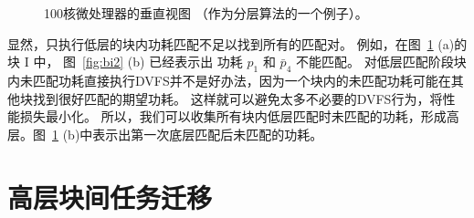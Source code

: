 \begin{figure}[H]
  \centering
  \caption{100核微处理器的垂直视图 （作为分层算法的一个例子）。}\label{fig:cpu_partition}
\end{figure}

显然，只执行低层的块内功耗匹配不足以找到所有的匹配对。
例如，在图~\ref{fig:cpu_partition} (a)的块 I 中， 图~\ref{fig:bi2} (b) 已经表示出
功耗 $p_1$ 和 $\bar{p}_4$ 不能匹配。
对低层匹配阶段块内未匹配功耗直接执行DVFS并不是好办法，因为一个块内的未匹配功耗可能在其他块找到很好匹配的期望功耗。
这样就可以避免太多不必要的DVFS行为，将性能损失最小化。
所以，我们可以收集所有块内低层匹配时未匹配的功耗，形成高层。图~\ref{fig:cpu_partition} (b)中表示出第一次底层匹配后未匹配的功耗。

\section{高层块间任务迁移}\label{sec:fm}






















































